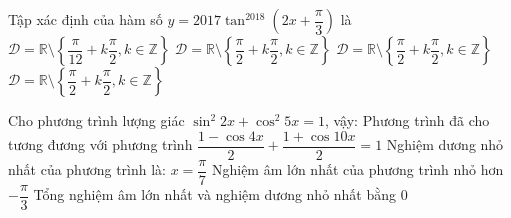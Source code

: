 \begin{ex}%
	Tập xác định của hàm số $y=2017\tan^{2018} \left( 2x+\dfrac{\pi}{3}\right)$ là
	\choice
	{\True $\mathscr{D}=\mathbb{R}\setminus\left\lbrace\dfrac{\pi}{12}+k\dfrac{\pi}{2}, k\in\mathbb{Z} \right\rbrace $}
	{$\mathscr{D}=\mathbb{R}\setminus\left\lbrace\dfrac{\pi}{2}+k\dfrac{\pi}{2}, k\in\mathbb{Z} \right\rbrace $}
	{$\mathscr{D}=\mathbb{R}\setminus\left\lbrace\dfrac{\pi}{2}+k\dfrac{\pi}{2}, k\in\mathbb{Z} \right\rbrace $}
	{$\mathscr{D}=\mathbb{R}\setminus\left\lbrace\dfrac{\pi}{2}+k\dfrac{\pi}{2}, k\in\mathbb{Z} \right\rbrace $}
\end{ex}


\TNTF

\begin{ex}%
	Cho phương trình lượng giác $\sin^2 2x+\cos^2 5x=1$, vậy:
	\choiceTF
	{\True Phương trình đã cho tương đương với phương trình $\dfrac{1-\cos4x}{2}+\dfrac{1+\cos10x}{2}=1$}
	{\True Nghiệm dương nhỏ nhất của phương trình là: $x=\dfrac{\pi}{7}$}
	{Nghiệm âm lớn nhất của phương trình nhỏ hơn $-\dfrac{\pi}{3}$}
	{\True Tổng nghiệm âm lớn nhất và nghiệm dương nhỏ nhất bằng $0$}
\end{ex}

